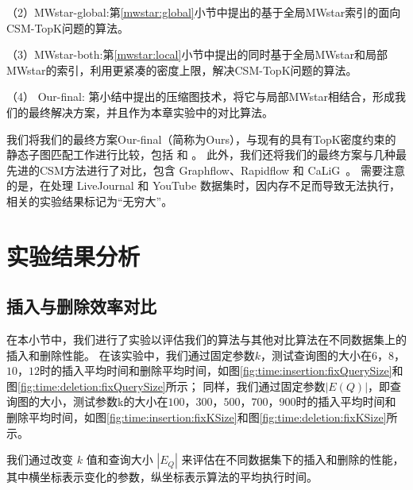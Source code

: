 （2）MWstar-global:第\ref{mwstar:global}小节中提出的基于全局MWstar索引的面向CSM-TopK问题的算法。

（3）MWstar-both:第\ref{mwstar:local}小节中提出的同时基于全局MWstar和局部MWstar的索引，利用更紧凑的密度上限，解决CSM-TopK问题的算法。

（4） Our-final: 第\label{mwstar:compact-graph}小结中提出的压缩图技术，将它与局部MWstar相结合，形成我们的最终解决方案，并且作为本章实验中的对比算法。

我们将我们的最终方案Our-final（简称为Ours），与现有的具有TopK密度约束的静态子图匹配工作进行比较，包括 \itk\cite{static-topk-Gupta-DBLP:conf/icde/GuptaGYCH14} 和 \pm\cite{static-topk-Chen-DBLP:journals/ijprai/ChenLCTL18}。
此外，我们还将我们的最终方案与几种最先进的CSM方法进行了对比，包含 Graphflow\cite{csm-graphflow-DBLP:conf/sigmod/KankanamgeSMCS17}、Rapidflow\cite{csm-rapidflow-DBLP:journals/pvldb/SunSHL22} 和 CaLiG~\cite{csm-calig-DBLP:journals/pacmmod/YangZZY23}。
需要注意的是，\itk 在处理 LiveJournal 和 YouTube 数据集时，因内存不足而导致无法执行，相关的实验结果标记为“无穷大”。

\section{实验结果分析}
\label{ch5:overall-compare}
\subsection{插入与删除效率对比}
\label{ch5:insertion-deletion}
在本小节中，我们进行了实验以评估我们的算法与其他对比算法在不同数据集上的插入和删除性能。
在该实验中，我们通过固定参数$k$，测试查询图的大小在$6$，$8$，$10$，$12$时的插入平均时间和删除平均时间，如图\ref{fig:time:insertion:fixQuerySize}和图\ref{fig:time:deletion:fixQuerySize}所示；
同样，我们通过固定参数$|E(Q)|$，即查询图的大小，测试参数k的大小在$100$，$300$，$500$，$700$，$900$时的插入平均时间和删除平均时间，如图\ref{fig:time:insertion:fixKSize}和图\ref{fig:time:deletion:fixKSize}所示。






我们通过改变 $k$ 值和查询大小 $|E_Q|$ 来评估在不同数据集下的插入和删除的性能，其中横坐标表示变化的参数，纵坐标表示算法的平均执行时间。


